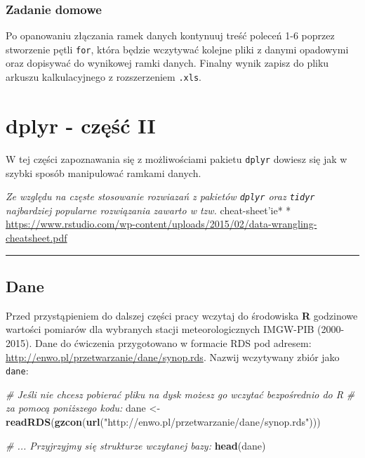 \documentclass[]{book}
\newenvironment{Shaded}{\begin{snugshade}}{\end{snugshade}}
\newcommand{\KeywordTok}[1]{\textcolor[rgb]{0.13,0.29,0.53}{\textbf{#1}}}
\newcommand{\StringTok}[1]{\textcolor[rgb]{0.31,0.60,0.02}{#1}}
\newcommand{\CommentTok}[1]{\textcolor[rgb]{0.56,0.35,0.01}{\textit{#1}}}
\newcommand{\NormalTok}[1]{#1}
\theoremstyle{definition}
\theoremstyle{definition}
\theoremstyle{definition}
\theoremstyle{remark}
\begin{document}
\subsection*{Zadanie domowe}\label{zadanie-domowe-5}

Po opanowaniu złączania ramek danych kontynuuj treść poleceń 1-6 poprzez
stworzenie pętli \texttt{for}, która będzie wczytywać kolejne pliki z
danymi opadowymi oraz dopisywać do wynikowej ramki danych. Finalny wynik
zapisz do pliku arkuszu kalkulacyjnego z rozszerzeniem \texttt{.xls}.

\chapter{dplyr - część II}\label{dplyr---czesc-ii}

W tej części zapoznawania się z możliwościami pakietu \texttt{dplyr}
dowiesz się jak w szybki sposób manipulować ramkami danych.

\emph{Ze względu na częste stosowanie rozwiazań z pakietów
\texttt{dplyr} oraz \texttt{tidyr} najbardziej popularne rozwiązania
zawarto w tzw. }cheat-sheet'ie* *
\url{https://www.rstudio.com/wp-content/uploads/2015/02/data-wrangling-cheatsheet.pdf}

\begin{center}\rule{0.5\linewidth}{\linethickness}\end{center}

\section*{Dane}\label{dane}

Przed przystąpieniem do dalszej części pracy wczytaj do środowiska
\textbf{R} godzinowe wartości pomiarów dla wybranych stacji
meteorologicznych IMGW-PIB (2000-2015). Dane do ćwiczenia przygotowano w
formacie RDS pod adresem:
\url{http://enwo.pl/przetwarzanie/dane/synop.rds}. Nazwij wczytywany
zbiór jako \texttt{dane}:

\begin{Shaded}
\begin{Highlighting}[]
\CommentTok{# Jeśli nie chcesz pobierać pliku na dysk możesz go wczytać bezpośrednio do R}
\CommentTok{# za pomocą poniższego kodu:}
\NormalTok{dane <-}\StringTok{  }\KeywordTok{readRDS}\NormalTok{(}\KeywordTok{gzcon}\NormalTok{(}\KeywordTok{url}\NormalTok{(}\StringTok{"http://enwo.pl/przetwarzanie/dane/synop.rds"}\NormalTok{)))}

\CommentTok{# ... Przyjrzyjmy się strukturze wczytanej bazy:}
\KeywordTok{head}\NormalTok{(dane)}
\end{Highlighting}
\end{Shaded}
\end{document}
